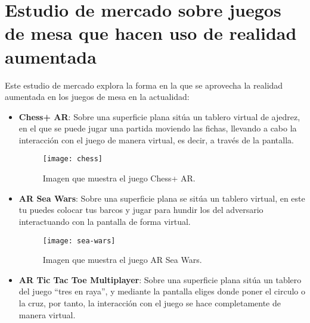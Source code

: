 \begin{itemize}
\begin{itemize}
\begin{itemize}
\begin{itemize}
  \end{itemize}
\end{itemize}


\section{Estudio de mercado sobre juegos de mesa que hacen uso de realidad aumentada}

Este estudio de mercado explora la forma en la que se aprovecha la realidad aumentada en los juegos de mesa en la actualidad:

\begin{itemize}
  \item \textbf{Chess+ AR}: Sobre una superficie plana sitúa un tablero virtual de ajedrez, en el que se puede jugar una partida moviendo las fichas, llevando a cabo la interacción con el juego de manera virtual, es decir, a través de la pantalla.

  \begin{figure}[h]
    \centering
    \texttt{[image: chess]}
    \caption{Imagen que muestra el juego Chess+ AR.\protect\footnotemark}
    \label{figura-siege-breakers}
  \end{figure}


  \newpage

  \item \textbf{AR Sea Wars}: Sobre una superficie plana se sitúa un tablero virtual, en este tu puedes colocar tus barcos y jugar para hundir los del adversario interactuando con la pantalla de forma virtual.

  \begin{figure}[h]
    \centering
    \texttt{[image: sea-wars]}
    \caption{Imagen que muestra el juego AR Sea Wars.\protect\footnotemark}
    \label{figura-sea-wars}
  \end{figure}


  \item \textbf{AR Tic Tac Toe Multiplayer}: Sobre una superficie plana sitúa un tablero del juego “tres en raya”, y mediante la pantalla eliges donde poner el circulo o la cruz, por tanto, la interacción con el juego se hace completamente de manera virtual.


\end{itemize}
\end{itemize}
\end{itemize}
